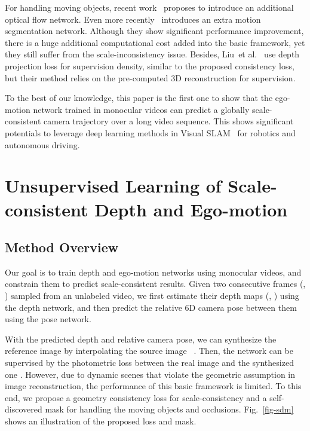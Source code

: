 \documentclass{article}
\newcommand{\figref}[1]{Fig.~\ref{#1}}
\def\etal{et al.}
\begin{document}
For handling moving objects, recent work~\cite{yin2018geonet, zou2018df} proposes to introduce an additional optical flow network.
Even more recently~\cite{ranjan2019cc} introduces an extra motion segmentation network.
Although they show significant performance improvement, there is a huge additional computational cost added into the basic framework, yet they still suffer from the scale-inconsistency issue.
Besides, Liu~\etal~\cite{liu2018self} use depth projection loss for supervision density, similar to the proposed consistency loss,
but their method relies on the pre-computed 3D reconstruction for supervision.

To the best of our knowledge, this paper is the first one to show that the ego-motion network trained in monocular videos can predict a globally scale-consistent camera trajectory over a long video sequence.
This shows significant potentials to leverage deep learning methods in Visual SLAM~\cite{mur2015orb} for robotics and autonomous driving.



\section{Unsupervised Learning of Scale-consistent Depth and Ego-motion}

\subsection{Method Overview}\label{sec-overview}
Our goal is to train depth and ego-motion networks using monocular videos,
and constrain them to predict scale-consistent results.
Given two consecutive frames (, ) sampled from an unlabeled video, 
we first estimate their depth maps (, ) using the depth network,
and then predict the relative 6D camera pose  between them using the pose network.

With the predicted depth and relative camera pose, we can synthesize the reference image  by interpolating the source image ~\cite{jaderberg2015stn, zhou2017unsupervised}.
Then, the network can be supervised by the photometric loss between the real image  and the synthesized one .
However, due to dynamic scenes that violate the geometric assumption in image reconstruction, the performance of this basic framework is limited.
To this end, we propose a geometry consistency loss  for scale-consistency and a self-discovered mask  for handling the moving objects and occlusions.
\figref{fig-sdm} shows an illustration of the proposed loss and mask.
\end{document}
